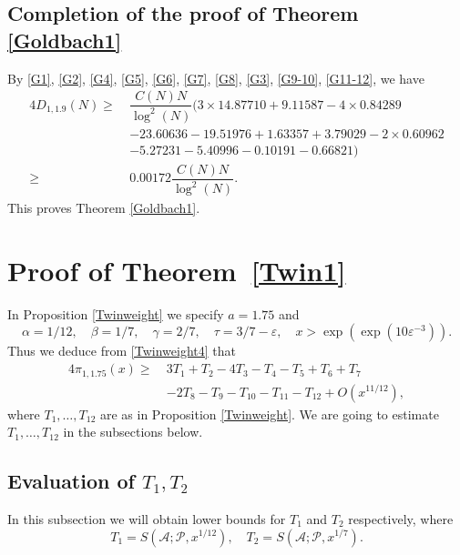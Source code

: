 \documentclass[12pt, a4paper]{amsart}
\def\geq{\geqslant}
\def\ge{\geqslant}
\theoremstyle{plain}
\theoremstyle{remark}
\numberwithin{equation}{section}
\begin{document}
\subsection{Completion of the proof of Theorem \ref{Goldbach1}} 
By \eqref{G1}, \eqref{G2}, \eqref{G4}, \eqref{G5}, \eqref{G6}, \eqref{G7}, \eqref{G8}, \eqref{G3}, \eqref{G9-10}, \eqref{G11-12}, 
we have
\begin{equation}
\begin{split}
4D_{1,1.9}(N)
\ge\ & \dfrac{C(N)N}{\log^2(N)}(3\times 14.87710+9.11587-4\times 0.84289 \\ 
& -23.60636-19.51976+1.63357+3.79029-2\times 0.60962\\ 
& -5.27231-5.40996-0.10191-0.66821)\\
\ge\ & 0.00172\dfrac{C(N)N}{\log^2(N)}. 
\end{split}
\end{equation}
This proves Theorem \ref{Goldbach1}.  

\section{Proof of Theorem~\ref{Twin1}}\label{sec6}
In Proposition \ref{Twinweight} we specify $a=1.75$ and 
\begin{equation}\label{Cond/Twin}
\alpha=1/12,\quad \beta=1/7,\quad \gamma=2/7,\quad \tau=3/7-\varepsilon,\quad x>\exp(\exp(10\varepsilon^{-3})).
\end{equation} 
Thus we deduce from \eqref{Twinweight4} that 
\begin{equation}\label{Twinw4}
\begin{split}
4\pi_{1,1.75}(x) \geq\ &3T_1 + T_2 -4T_3- T_4- T_5 + T_6 + T_7 \\
&- 2T_8 - T_9 - T_{10} - T_{11} - T_{12} + O(x^{11/12}),
\end{split}
\end{equation}
where $T_1, \ldots, T_{12}$ are as in Proposition \ref{Twinweight}. We are going to estimate $T_1, \ldots, T_{12}$ 
in the subsections below.

\subsection{Evaluation of $T_1,T_2$}
In this subsection we will obtain lower bounds for $T_1$ and $T_2$ respectively, where
\[
T_1 = S(\mathscr{A}; \mathscr{P}, x^{1/12}), 
\quad 
T_2 = S(\mathscr{A}; \mathscr{P}, x^{1/7}).
\]
\end{document}
